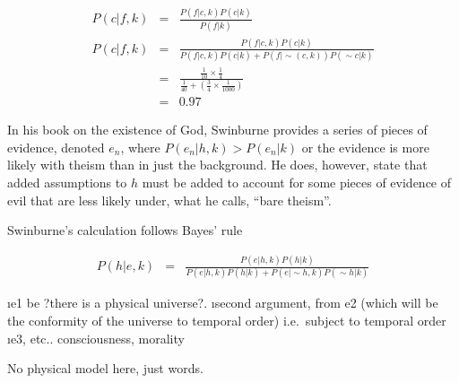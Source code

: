 \documentclass{tufte-book}
\begin{document}
\begin{eqnarray*}
P(c|f,k) &=& \frac{P(f|c,k) P(c|k)}{P(f|k)}\\
P(c|f,k) &=& \frac{P(f|c,k) P(c|k)}{P(f|c,k) P(c|k) + P(f|\sim(c,k)) P(\sim c|k)}\\
&=& \frac{\frac{1}{10}\times \frac{1}{4}}{\frac{1}{40} + \left(\frac{3}{4}\times\frac{1}{1000}\right)} \\
&=& 0.97
\end{eqnarray*}

In his book on the existence of God, Swinburne provides a series of
pieces of evidence, denoted \(e_{n}\), where \(P(e_{n}|h,k)>P(e_{n}|k)\)
or the evidence is more likely with theism than in just the background.
He does, however, state that added assumptions to \(h\) must be added to
account for some pieces of evidence of evil that are less likely under,
what he calls, ``bare theism''.


Swinburne's calculation follows Bayes' rule

\begin{eqnarray*}
P(h|e,k) &=& \frac{P(e|h,k)P(h|k)}{P(e|h,k)P(h|k)+P(e|\sim h,k)P(\sim h|k)}
\end{eqnarray*}


\bi
\i e1 be ?there is a physical universe?. \i second argument, from e2
(which will be the conformity of the universe to temporal order)
i.e.~subject to temporal order \i e3, etc.. consciousness, morality \ei

No physical model here, just words.
\end{document}
